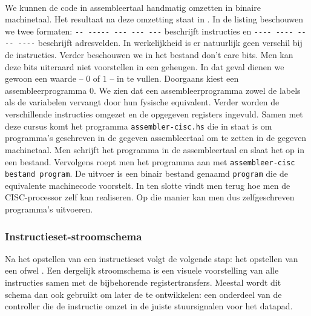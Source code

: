 \paragraph{}
We kunnen de code in assembleertaal handmatig omzetten in binaire machinetaal. Het resultaat na deze omzetting staat in . In de listing beschouwen we twee formaten: \verb+-- ----- --- --- ---+ beschrijft instructies en \verb+---- ---- ---- ----+ beschrijft adresvelden. In werkelijkheid is er natuurlijk geen verschil bij de instructies. Verder beschouwen we in het bestand don't care bits. Men kan deze bits uiteraard niet voorstellen in een geheugen. In dat geval dienen we gewoon een waarde -- $0$ of $1$ -- in te vullen. Doorgaans kiest een assembleerprogramma $0$. We zien dat een assembleerprogramma zowel de labels als de variabelen vervangt door hun fysische equivalent. Verder worden de verschillende instructies omgezet en de opgegeven registers ingevuld. Samen met deze cursus komt het programma \verb+assembler-cisc.hs+ die in staat is om programma's geschreven in de gegeven assembleertaal om te zetten in de gegeven machinetaal. Men schrijft het programma in de assembleertaal en slaat het op in een bestand. Vervolgens roept men het programma aan met \verb+assembleer-cisc bestand program+. De uitvoer is een binair bestand genaamd \verb+program+ die de equivalente machinecode voorstelt. In  ten slotte vindt men terug hoe men de CISC-processor zelf kan realiseren. Op die manier kan men dus zelfgeschreven programma's uitvoeren.
\subsubsection{Instructieset-stroomschema}
Na het opstellen van een instructieset volgt de volgende stap: het opstellen van een  ofwel . Een dergelijk stroomschema is een visuele voorstelling van alle instructies samen met de bijbehorende registertransfers. Meestal wordt dit schema dan ook gebruikt om later de  te ontwikkelen: een onderdeel van de controller die de instructie omzet in de juiste stuursignalen voor het datapad.
